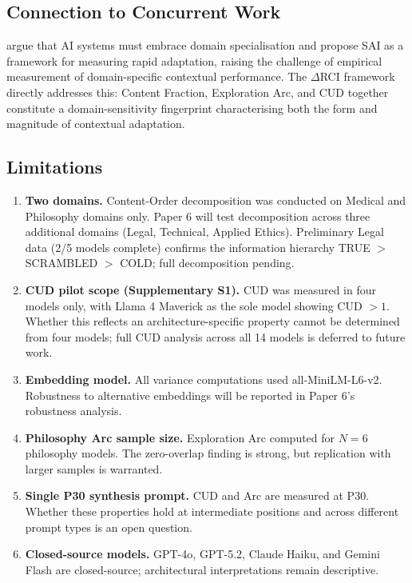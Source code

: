 \documentclass[11pt,a4paper]{article}
\begin{document}
\subsection{Connection to Concurrent Work}

\citet{goldfeder2026ai} argue that AI systems must embrace domain specialisation and propose SAI as a framework for measuring rapid adaptation, raising the challenge of empirical measurement of domain-specific contextual performance. The $\Delta$RCI framework directly addresses this: Content Fraction, Exploration Arc, and CUD together constitute a domain-sensitivity fingerprint characterising both the form and magnitude of contextual adaptation.

\subsection{Limitations}

\begin{enumerate}
    \item \textbf{Two domains.} Content-Order decomposition was conducted on Medical and Philosophy domains only. Paper 6 \citep{laxman2026paper6} will test decomposition across three additional domains (Legal, Technical, Applied Ethics). Preliminary Legal data (2/5 models complete) confirms the information hierarchy TRUE $>$ SCRAMBLED $>$ COLD; full decomposition pending.
    \item \textbf{CUD pilot scope (Supplementary S1).} CUD was measured in four models only, with Llama 4 Maverick as the sole model showing CUD $> 1$. Whether this reflects an architecture-specific property cannot be determined from four models; full CUD analysis across all 14 models is deferred to future work.
    \item \textbf{Embedding model.} All variance computations used all-MiniLM-L6-v2. Robustness to alternative embeddings will be reported in Paper 6's robustness analysis.
    \item \textbf{Philosophy Arc sample size.} Exploration Arc computed for $N = 6$ philosophy models. The zero-overlap finding is strong, but replication with larger samples is warranted.
    \item \textbf{Single P30 synthesis prompt.} CUD and Arc are measured at P30. Whether these properties hold at intermediate positions and across different prompt types is an open question.
    \item \textbf{Closed-source models.} GPT-4o, GPT-5.2, Claude Haiku, and Gemini Flash are closed-source; architectural interpretations remain descriptive.
\end{enumerate}
\end{document}
